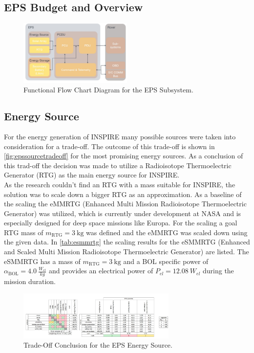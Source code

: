 \subsection{EPS Budget and Overview}

\begin{figure}[htb]
{\centering
\includegraphics[width=0.5\textwidth]{Media/epsflowchart}
\caption{Functional Flow Chart Diagram for the EPS Subsystem.}
\label{fig:epsflowchart}
}
\end{figure}

\subsection{Energy Source}
For the energy generation of INSPIRE many possible sources were taken into consideration for a trade-off. The outcome of this trade-off is shown in \autoref{fig:epssourcetradeoff} for the most promising energy sources. As a conclusion of this trad-off the decision was made to utilize a Radioisotope Thermoelectric Generator (RTG) as the main energy source for INSPIRE. \\

As the research couldn't find an RTG with a mass suitable for INSPIRE, the solution was to scale down a bigger RTG as an approximation. As a baseline of the scaling the eMMRTG (Enhanced Multi Mission Radioisotope Thermoelectric Generator) was utilized, which is currently under development at NASA and is especially designed for deep space missions like Europa. For the scaling a goal RTG mass of $m_\text{RTG}=3 \ \text{kg}$ was defined and the eMMRTG was scaled down using the given data.
In \autoref{tab:esmmrtg} the scaling results for the eSMMRTG (Enhanced and Scaled Multi Mission Radioisotope Thermoelectric Generator) are listed. The eSMMRTG has a mass of $m_\text{RTG}=3 \ \text{kg}$ and a BOL specific power of $\alpha_\text{BOL}= 4.0 \ \frac{W_{el}}{kg}$ and provides an electrical power of $P_{el} = 12.08 \ W_{el}$ during the mission duration.



\begin{figure}[htb]
{\centering
\includegraphics[width=0.7\textwidth]{Media/epssourcetradeoff}
\caption{Trade-Off Conclusion for the EPS Energy Source.}
\label{fig:epssourcetradeoff}
}
\end{figure}

